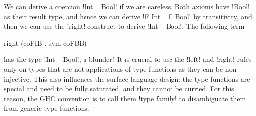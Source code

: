 \documentclass[screen,nonacm,manuscript,review]{acmart} %
\begin{document}
We can derive a coercion !Int ~ Bool! if we are careless.
Both axioms have !Bool! as their result type, and hence
we can derive !F Int ~ F Bool! by transitivity, and then
we can use the !right! construct to derive !Int ~ Bool!.
The following term

\begin{CenteredBox}
\begin{code}
 right (coFIB  . sym coFBB)
\end{code}
\end{CenteredBox}

has the type !Int ~ Bool!, a blunder$!$ It is crucial to use the !left! and !right!
rules only on types that are not applications of type functions as
they can be non-injective. This also influences the surface language
design: the type functions are special and need to be fully saturated,
and they cannot be curried. For this reason, the GHC convention is
to call them !type family! to disambiguate them from
generic type functions.
\end{document}
